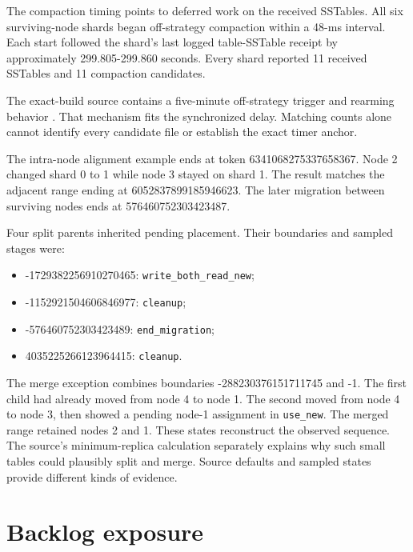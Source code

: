 The compaction timing points to deferred work on the received SSTables. All six surviving-node shards began off-strategy compaction within a 48-ms interval. Each start followed the shard's last logged table-SSTable receipt by approximately 299.805-299.860 seconds. Every shard reported 11 received SSTables and 11 compaction candidates.

The exact-build source contains a five-minute off-strategy trigger and rearming behavior \cite{r15,r16}. That mechanism fits the synchronized delay. Matching counts alone cannot identify every candidate file or establish the exact timer anchor.

The intra-node alignment example ends at token 6341068275337658367. Node 2 changed shard 0 to 1 while node 3 stayed on shard 1. The result matches the adjacent range ending at 6052837899185946623. The later migration between surviving nodes ends at 576460752303423487.

Four split parents inherited pending placement. Their boundaries and sampled stages were:
\begin{itemize}
\item -1729382256910270465: \texttt{write\_both\_read\_new};
\item -1152921504606846977: \texttt{cleanup};
\item -576460752303423489: \texttt{end\_migration};
\item 4035225266123964415: \texttt{cleanup}.
\end{itemize}

The merge exception combines boundaries -288230376151711745 and -1. The first child had already moved from node 4 to node 1. The second moved from node 4 to node 3, then showed a pending node-1 assignment in \texttt{use\_new}. The merged range retained nodes 2 and 1. These states reconstruct the observed sequence. The source's minimum-replica calculation separately explains why such small tables could plausibly split and merge. Source defaults and sampled states provide different kinds of evidence.

\newpage

\hypertarget{backlog-exposure}{%
\section{Backlog exposure}\label{backlog-exposure}}

